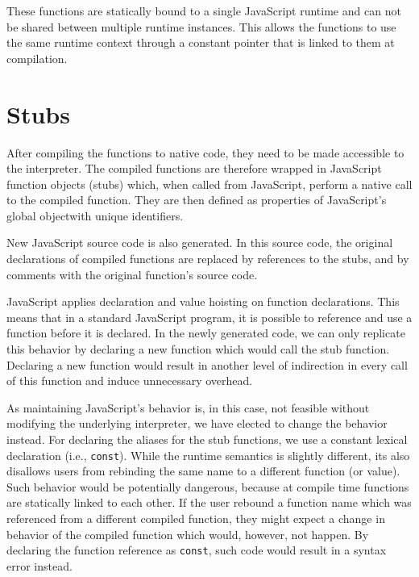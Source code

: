 These functions are statically bound to a single JavaScript runtime and can not be shared between multiple runtime instances. This allows the functions to use the same runtime context through a constant pointer that is linked to them at compilation.


\section{Stubs}\label{impl:stubs}

After compiling the functions to native code, they need to be made accessible to the interpreter. The compiled functions are therefore wrapped in JavaScript function objects (stubs) which, when called from JavaScript, perform a native call to the compiled function. They are then defined as properties of JavaScript's global object\footnotemark[1] with unique identifiers.


New JavaScript source code is also generated. In this source code, the original declarations of compiled functions are replaced by references to the stubs, and by comments with the original function's source code.

JavaScript applies declaration and value hoisting on function declarations. This means that in a standard JavaScript program, it is possible to reference and use a function before it is declared. In the newly generated code, we can only replicate this behavior by declaring a new function which would call the stub function. Declaring a new function would result in another level of indirection in every call of this function and induce unnecessary overhead.

As maintaining JavaScript's behavior is, in this case, not feasible without modifying the underlying interpreter, we have elected to change the behavior instead. For declaring the aliases for the stub functions, we use a constant lexical declaration (i.e., \texttt{const}). While the runtime semantics is slightly different, its also disallows users from rebinding the same name to a different function (or value). Such behavior would be potentially dangerous, because at compile time functions are statically linked to each other. If the user rebound a function name which was referenced from a different compiled function, they might expect a change in behavior of the compiled function which would, however, not happen. By declaring the function reference as \texttt{const}, such code would result in a syntax error instead.


